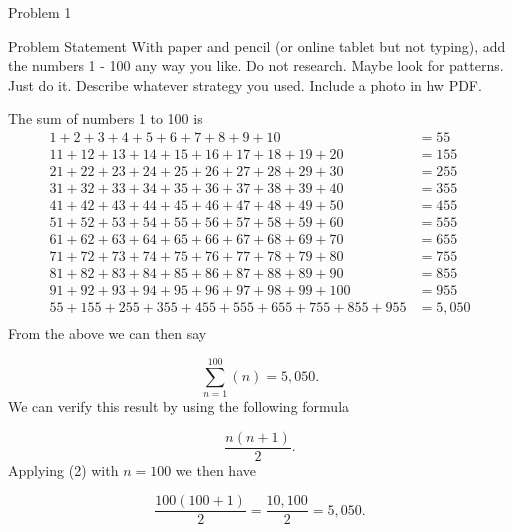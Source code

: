 \begin{problem}{Problem 1}
    \begin{statement}{Problem Statement}
        With paper and pencil (or online tablet but not typing), add the numbers 1 - 100 any way you like. Do not research. Maybe look for patterns. Just do it.  Describe whatever strategy you used. 
        Include a photo in hw PDF.
    \end{statement}

    \begin{Highlight}[Solution]
        The sum of numbers 1 to 100 is
        \begin{align*}
            1 + 2 + 3 + 4 + 5 + 6 + 7 + 8 + 9 + 10 & = 55 \\
            11 + 12 + 13 + 14 + 15 + 16 + 17 + 18 + 19 + 20 & = 155 \\
            21 + 22 + 23 + 24 + 25 + 26 + 27 + 28 + 29 + 30 & = 255 \\
            31 + 32 + 33 + 34 + 35 + 36 + 37 + 38 + 39 + 40 & = 355 \\
            41 + 42 + 43 + 44 + 45 + 46 + 47 + 48 + 49 + 50 & = 455 \\
            51 + 52 + 53 + 54 + 55 + 56 + 57 + 58 + 59 + 60 & = 555 \\
            61 + 62 + 63 + 64 + 65 + 66 + 67 + 68 + 69 + 70 & = 655 \\
            71 + 72 + 73 + 74 + 75 + 76 + 77 + 78 + 79 + 80 & = 755 \\
            81 + 82 + 83 + 84 + 85 + 86 + 87 + 88 + 89 + 90 & = 855 \\
            91 + 92 + 93 + 94 + 95 + 96 + 97 + 98 + 99 + 100 & = 955 \\
            55 + 155 + 255 + 355 + 455 + 555 + 655 + 755 + 855 + 955 & = 5,050 \\
        \end{align*}
        From the above we can then say

        \setcounter{equation}{0}
        \begin{equation}
            \sum_{n = 1}^{100} (n) = 5,050.
        \end{equation}
        We can verify this result by using the following formula 

        \begin{equation}
            \frac{n(n + 1)}{2}.
        \end{equation}
        Applying (2) with $n = 100$ we then have

        \begin{equation}
            \frac{100(100 + 1)}{2} = \frac{10,100}{2} = 5,050.
        \end{equation}
    \end{Highlight}

    
\end{problem}

